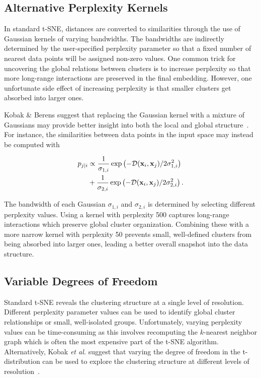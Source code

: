 \documentclass[twocolumn]{bmcart}
\begin{document}
\subsection*{Alternative Perplexity Kernels}

In standard t-SNE, distances are converted to similarities through the use of
Gaussian kernels of varying bandwidths. The bandwidths are indirectly determined
by the user-specified perplexity parameter so that a fixed number of nearest
data points will be assigned non-zero values. One common trick for uncovering
the global relations between clusters is to increase perplexity so that more
long-range interactions are preserved in the final embedding.  However, one
unfortunate side effect of increasing perplexity is that smaller clusters get
absorbed into larger ones.

Kobak \& Berens suggest that replacing the Gaussian kernel with a mixture of
Gaussians may provide better insight into both the local and global
structure~\cite{kobak2019art}. For instance, the similarities between data
points in the input space may instead be computed with

\begin{align}
  p_{j\mid i} &\propto \frac{1}{\sigma_{1,i}} \exp \left ( -\mathcal{D}(\mathbf{x}_i, \mathbf{x}_j ) / 2\sigma_{1,i}^2 \right ) \notag \\
  &+ \frac{1}{\sigma_{2,i}} \exp \left ( -\mathcal{D}(\mathbf{x}_i, \mathbf{x}_j ) / 2\sigma_{2,i}^2 \right ).
\end{align}

The bandwidth of each Gaussian $\sigma_{1,i}$ and $\sigma_{2,i}$ is determined
by selecting different perplexity values. Using a kernel with perplexity 500
captures long-range interactions which preserve global cluster organization.
Combining these with a more narrow kernel with perplexity 50 prevents small,
well-defined clusters from being absorbed into larger ones, leading a better
overall snapshot into the data structure.

\subsection*{Variable Degrees of Freedom}

Standard t-SNE reveals the clustering structure at a single level of resolution.
Different perplexity parameter values can be used to identify global cluster
relationships or small, well-isolated groups. Unfortunately, varying perplexity
values can be time-consuming as this involves recomputing the $k$-nearest
neighbor graph which is often the most expensive part of the t-SNE algorithm.
Alternatively, Kobak \textit{et al.} suggest that varying the degree of freedom
in the t-distribution can be used to explore the clustering structure at
different levels of resolution~\cite{kobak2019heavy}. 
\end{document}
